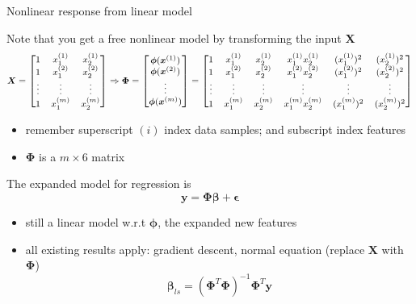 \documentclass[ignorenonframetext,aspectratio=169]{beamer}
\providecommand{\tightlist}{%
  \setlength{\itemsep}{0pt}\setlength{\parskip}{0pt}}
\newcommand{\vv}[1]{\boldsymbol{#1}}
\newcommand{\di}[2]{\ensuremath{ #1^{(#2)}}}
\newcommand{\Di}[2]{\ensuremath{ \vv{#1}^{(#2)}}}
\begin{document}
\begin{frame}{Nonlinear response from linear model}
\protect\hypertarget{nonlinear-response-from-linear-model}{}

Note that you get a free nonlinear model by transforming the input
\(\vv{X}\)
\[\footnotesize \vv{X} = \begin{bmatrix} 1& \di{x}{1}_1& \di{x}{1}_2 \\
1& \di{x}{2}_1& \di{x}{2}_2 \\
\vdots& \vdots& \vdots \\
1 &  \di{x}{m}_1& \di{x}{m}_2
\end{bmatrix} \Rightarrow \vv{\Phi} =\begin{bmatrix} \vv{\phi}(\Di{x}{1}) \\
\vv{\phi}(\Di{x}{2}) \\
\vdots \\
\vv{\phi}(\Di{x}{m})
\end{bmatrix} = \begin{bmatrix} 1& \di{x}{1}_1& \di{x}{1}_2& \di{x}{1}_1 \di{x}{1}_2& (\di{x}{1}_1)^2 & (\di{x}{1}_2)^2\\
1& \di{x}{2}_1& \di{x}{2}_2& \di{x}{2}_1 \di{x}{2}_2& (\di{x}{2}_1)^2 & (\di{x}{2}_2)^2\\
\vdots& \vdots& \vdots & \vdots & \vdots & \vdots\\
1& \di{x}{m}_1& \di{x}{m}_2& \di{x}{m}_1 \di{x}{m}_2& (\di{x}{m}_1)^2 & (\di{x}{m}_2)^2\\
\end{bmatrix}\]

\begin{itemize}
\tightlist
\item
  remember superscript \((i)\) index data samples; and subscript index
  features
\item
  \(\vv{\Phi}\) is a \(m\times 6\) matrix
\end{itemize}

\normalsize

The expanded model for regression is
\[\vv{y} = \vv{\Phi}\vv{\beta} + \vv{\epsilon}\]

\begin{itemize}
\tightlist
\item
  still a linear model w.r.t \(\vv{\phi}\), the expanded new features
\item
  all existing results apply: gradient descent, normal equation (replace
  \(\vv{X}\) with \(\vv{\Phi}\))
  \[\vv{\beta}_{ls} =(\vv{\Phi}^T\vv{\Phi})^{-1}\vv{\Phi}^T\vv{y}\]
\end{itemize}

\end{frame}
\end{document}
